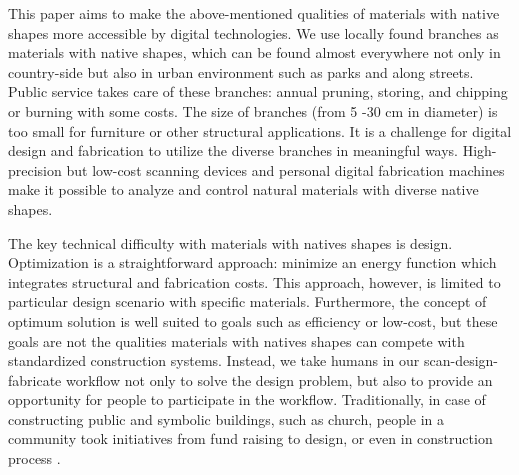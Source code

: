This paper aims to make the above-mentioned qualities of materials with native shapes more accessible by digital technologies.
We use locally found branches as materials with native shapes, which can be found almost everywhere not only in country-side but also in urban environment such as parks and along streets.
Public service takes care of these branches: annual pruning, storing, and chipping or burning with some costs.
The size of branches (from 5 -30 cm in diameter) is too small for furniture or other structural applications.
It is a challenge for digital design and fabrication to utilize the diverse branches in meaningful ways.
High-precision but low-cost scanning devices and personal digital fabrication machines make it possible to analyze and control natural materials with diverse native shapes.

The key technical difficulty with materials with natives shapes is design.
Optimization is a straightforward approach: minimize an energy function which integrates structural and fabrication costs.
This approach, however, is limited to particular design scenario with specific materials.
Furthermore, the concept of optimum solution is well suited to goals such as efficiency or low-cost, but these goals are not the qualities materials with natives shapes can compete with standardized construction systems.
Instead, we take humans in our scan-design-fabricate workflow not only to solve the design problem, but also to provide an opportunity for people to participate in the workflow.
Traditionally, in case of constructing public and symbolic buildings, such as church, people in a community took initiatives from fund raising to design, or even in construction process \cite{}. 




